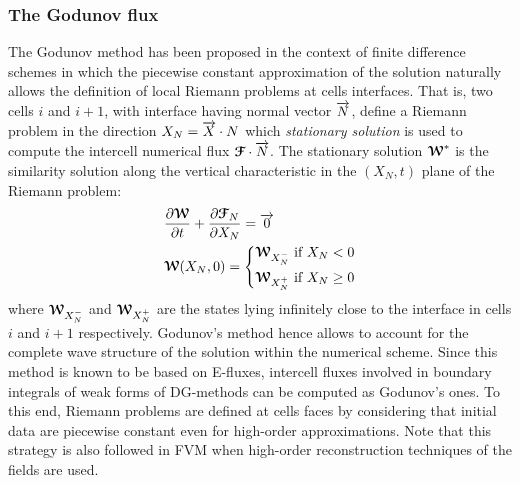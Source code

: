 \subsubsection*{The Godunov flux}
The Godunov method \cite{Godunov_method} has been proposed in the context of finite difference schemes in which the piecewise constant approximation of the solution naturally allows the definition of local Riemann problems at cells interfaces. That is, two cells $i$ and $i+1$, with interface having normal vector ${\overrightarrow{N}}$, define a Riemann problem in the direction $X_N={\overrightarrow{X}}\cdot{N}$ which \textit{stationary solution} is used to compute the intercell numerical flux ${\boldsymbol{\mathcal{F}}} \cdot {\overrightarrow{N}}$. The stationary solution ${\boldsymbol{\mathcal{W}}}^*$ is the similarity solution along the vertical characteristic in the $(X_N,t)$ plane of the Riemann problem:
\begin{equation}
  \label{eq:RP_mesh}
  \begin{aligned}
    &\frac{\partial {\boldsymbol{\mathcal{W}}}}{\partial t} + \frac{\partial {\boldsymbol{\mathcal{F}}}_N}{\partial X_N} = {\overrightarrow{0}}  \\
    & {\boldsymbol{\mathcal{W}}}(X_N,0)= \left\lbrace 
      \begin{aligned}
        & {\boldsymbol{\mathcal{W}}}_{X_N^-} \text{ if } X_N <0 \\
        & {\boldsymbol{\mathcal{W}}}_{X_N^{+}} \text{ if } X_N \geq 0
      \end{aligned}
        \right.
  \end{aligned}
\end{equation}
where ${\boldsymbol{\mathcal{W}}}_{X_N^-}$ and ${\boldsymbol{\mathcal{W}}}_{X_N^{+}}$ are the states lying infinitely close to the interface in cells $i$ and $i+1$ respectively. 
Godunov's method hence allows to account for the complete wave structure of the solution within the numerical scheme. Since this method is known to be based on E-fluxes, intercell fluxes involved in boundary integrals of weak forms of DG-methods can be computed as Godunov's ones. To this end, Riemann problems are defined at cells faces by considering that initial data are piecewise constant even for high-order approximations. Note that this strategy is also followed in FVM when high-order reconstruction techniques of the fields are used.

